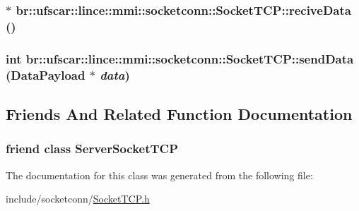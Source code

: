 \label{classbr_1_1ufscar_1_1lince_1_1mmi_1_1socketconn_1_1SocketTCP_a242631145b3bab7c7d6c08c5b76eb39a}
\hypertarget{classbr_1_1ufscar_1_1lince_1_1mmi_1_1socketconn_1_1SocketTCP_a2b577c784c4b34867851108230c5dedd}{
\subsubsection[{reciveData}]{$\ast$ br::ufscar::lince::mmi::socketconn::SocketTCP::reciveData ()}}
\label{classbr_1_1ufscar_1_1lince_1_1mmi_1_1socketconn_1_1SocketTCP_a2b577c784c4b34867851108230c5dedd}
\hypertarget{classbr_1_1ufscar_1_1lince_1_1mmi_1_1socketconn_1_1SocketTCP_ae677b051d5e7a83bd0e3b7b947c5256b}{
\subsubsection[{sendData}]{\setlength{\rightskip}{0pt plus 5cm}int br::ufscar::lince::mmi::socketconn::SocketTCP::sendData ({\bf DataPayload} $\ast$ {\em data})}}
\label{classbr_1_1ufscar_1_1lince_1_1mmi_1_1socketconn_1_1SocketTCP_ae677b051d5e7a83bd0e3b7b947c5256b}


\subsection{Friends And Related Function Documentation}
\hypertarget{classbr_1_1ufscar_1_1lince_1_1mmi_1_1socketconn_1_1SocketTCP_a1fb2b529851e5c95e720a67fbc1aaaa1}{
\subsubsection[{ServerSocketTCP}]{\setlength{\rightskip}{0pt plus 5cm}friend class {\bf ServerSocketTCP}}}
\label{classbr_1_1ufscar_1_1lince_1_1mmi_1_1socketconn_1_1SocketTCP_a1fb2b529851e5c95e720a67fbc1aaaa1}


The documentation for this class was generated from the following file:\begin{DoxyCompactItemize}
\item 
include/socketconn/\hyperlink{SocketTCP_8h}{SocketTCP.h}\end{DoxyCompactItemize}
